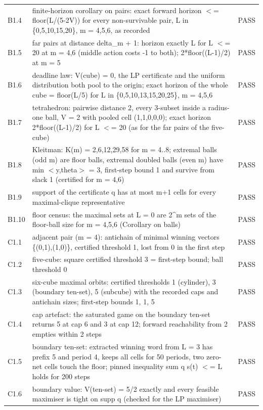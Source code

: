 \documentclass[11pt,a4paper]{article}
\theoremstyle{plain}
\theoremstyle{definition}
\theoremstyle{remark}
\begin{document}
{\begin{longtable}{@{}l p{} l@{}}
B1.4 & finite-horizon corollary on pairs: exact forward horizon $<$= floor(L/(5-2V)) for every non-survivable pair, L in \{0,5,10,15,20\}, m = 4,5,6, as recorded & PASS\\
B1.5 & far pairs at distance delta\_m + 1: horizon exactly L for L $<$= 20 at m = 4,6 (middle action costs -1 to both); 2*floor((L-1)/2) at m = 5 & PASS\\
B1.6 & deadline law: V(cube) = 0, the LP certificate and the uniform distribution both pool to the origin; exact horizon of the whole cube = floor(L/5) for L in \{0,5,10,13,15,20,25\}, m = 4,5,6 & PASS\\
B1.7 & tetrahedron: pairwise distance 2, every 3-subset inside a radius-one ball, V = 2 with pooled cell (1,1,0,0,0); exact horizon 2*floor((L-1)/2) for L $<$= 20 (as for the far pairs of the five-cube) & PASS\\
B1.8 & Kleitman: K(m) = 2,6,12,29,58 for m = 4..8; extremal balls (odd m) are floor balls, extremal doubled balls (even m) have min $<$y,theta$>$ = 3, first-step bound 1 and survive from slack 1 (certified for m = 4,6) & PASS\\
B1.9 & support of the certificate q has at most m+1 cells for every maximal-clique representative & PASS\\
B1.10 & floor census: the maximal sets at L = 0 are 2\^{}m sets of the floor-ball size for m = 4,5,6 (Corollary on balls) & PASS\\
C1.1 & adjacent pair (m = 4): antichain of minimal winning vectors \{(0,1),(1,0)\}, certified threshold 1, lost from 0 in the first step & PASS\\
C1.2 & five-cube: square certified threshold 3 = first-step bound; ball threshold 0 & PASS\\
C1.3 & six-cube maximal orbits: certified thresholds 1 (cylinder), 3 (boundary ten-set), 5 (subcube) with the recorded caps and antichain sizes; first-step bounds 1, 1, 5 & PASS\\
C1.4 & cap artefact: the saturated game on the boundary ten-set returns 5 at cap 6 and 3 at cap 12; forward reachability from 2 empties within 2 steps & PASS\\
C1.5 & boundary ten-set: extracted winning word from L = 3 has prefix 5 and period 4, keeps all cells for 50 periods, two zero-net cells touch the floor; pinned inequality sum q s(t) $<$= L holds for 200 steps & PASS\\
C1.6 & boundary value: V(ten-set) = 5/2 exactly and every feasible maximiser is tight on supp q (checked for the LP maximiser) & PASS\\

\end{longtable}}
\end{document}
